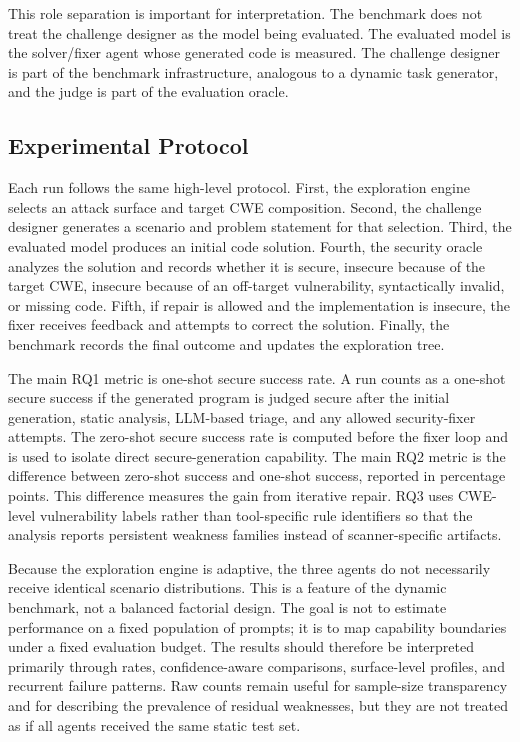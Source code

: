 \documentclass[11pt]{article}
\begin{document}
This role separation is important for interpretation. The benchmark does not treat the challenge designer as the model being evaluated. The evaluated model is the solver/fixer agent whose generated code is measured. The challenge designer is part of the benchmark infrastructure, analogous to a dynamic task generator, and the judge is part of the evaluation oracle.

\subsection{Experimental Protocol}

Each run follows the same high-level protocol. First, the exploration engine selects an attack surface and target CWE composition. Second, the challenge designer generates a scenario and problem statement for that selection. Third, the evaluated model produces an initial code solution. Fourth, the security oracle analyzes the solution and records whether it is secure, insecure because of the target CWE, insecure because of an off-target vulnerability, syntactically invalid, or missing code. Fifth, if repair is allowed and the implementation is insecure, the fixer receives feedback and attempts to correct the solution. Finally, the benchmark records the final outcome and updates the exploration tree.

The main RQ1 metric is one-shot secure success rate. A run counts as a one-shot secure success if the generated program is judged secure after the initial generation, static analysis, LLM-based triage, and any allowed security-fixer attempts. The zero-shot secure success rate is computed before the fixer loop and is used to isolate direct secure-generation capability. The main RQ2 metric is the difference between zero-shot success and one-shot success, reported in percentage points. This difference measures the gain from iterative repair. RQ3 uses CWE-level vulnerability labels rather than tool-specific rule identifiers so that the analysis reports persistent weakness families instead of scanner-specific artifacts.

Because the exploration engine is adaptive, the three agents do not necessarily receive identical scenario distributions. This is a feature of the dynamic benchmark, not a balanced factorial design. The goal is not to estimate performance on a fixed population of prompts; it is to map capability boundaries under a fixed evaluation budget. The results should therefore be interpreted primarily through rates, confidence-aware comparisons, surface-level profiles, and recurrent failure patterns. Raw counts remain useful for sample-size transparency and for describing the prevalence of residual weaknesses, but they are not treated as if all agents received the same static test set.
\end{document}
